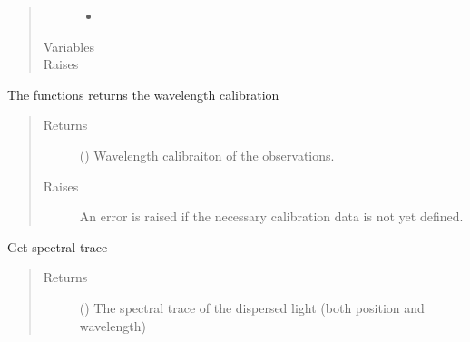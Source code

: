 \documentclass[a4paper,10pt,english]{sphinxmanual}
\begin{document}
\begin{fulllineitems}
\begin{fulllineitems}
\begin{quote}
\begin{description}
\begin{itemize}
\item {} 
 \textendash{} 

\end{itemize}

\item[{Variables}] \leavevmode
{} \textendash{} 

\item[{Raises}] \leavevmode
{}

\end{description}\end{quote}

\end{fulllineitems}


\begin{fulllineitems}
\label{\detokenize{cascade.instruments:cascade.instruments.instruments.HSTWFC3._get_wavelength_calibration}}
The functions returns the wavelength calibration
\begin{quote}\begin{description}
\item[{Returns}] \leavevmode
{} () \textendash{} Wavelength calibraiton of the observations.

\item[{Raises}] \leavevmode
{} \textendash{} An error is raised if the necessary calibration data
is not yet defined.

\end{description}\end{quote}

\end{fulllineitems}


\begin{fulllineitems}
\label{\detokenize{cascade.instruments:cascade.instruments.instruments.HSTWFC3.get_spectral_trace}}
Get spectral trace
\begin{quote}\begin{description}
\item[{Returns}] \leavevmode
{} () \textendash{} The spectral trace of the dispersed light (both position and
wavelength)


\end{description}
\end{quote}
\end{fulllineitems}
\end{fulllineitems}
\end{document}
